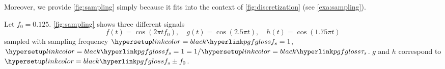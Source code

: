 Moreover, we provide \cref{fig:sampling} simply because it fits into the context of \cref{fig:discretization} (see \cref{exa:sampling}).


\begin{myexample}[Aliasing]\label{exa:sampling}
	Let $f_0 = 0.125$. \cref{fig:sampling} shows three different signals
	\[
	\displaystyle f(t) = \cos(2\pi t f_0),\quad
	g(t) = \cos(2.5\pi t),\quad
	h(t) = \cos(1.75\pi t)
	\]
	sampled with sampling frequency \(\samplingfreq=1\), \ie \(\samplingfreq = 1 = {1}/\sampletime\). $g$ and $h$ correspond to $\samplingfreq \pm f_0$.
\end{myexample}

\begin{figure*}
	\centering
	
	\caption{\Cf \cref{exa:sampling}.}\label{fig:sampling}
\end{figure*}
